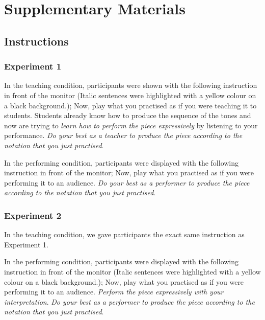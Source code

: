 \documentclass[
  english,
  man,floatsintext]{apa6}
\begin{document}
\endgroup

\clearpage

\hypertarget{supplementary}{%
\section{Supplementary Materials}\label{supplementary}}

\hypertarget{instructions}{%
\subsection{Instructions}\label{instructions}}

\hypertarget{experiment-1-1}{%
\subsubsection{Experiment 1}\label{experiment-1-1}}

In the teaching condition, participants were shown with the following instruction in front of the monitor (Italic sentences were highlighted with a yellow colour on a black background.); Now, play what you practised as if you were teaching it to students. Students already know how to produce the sequence of the tones and now are trying to \emph{learn how to perform the piece expressively} by listening to your performance. \emph{Do your best as a teacher to produce the piece according to the notation that you just practised}.

In the performing condition, participants were displayed with the following instruction in front of the monitor; Now, play what you practised as if you were performing it to an audience. \emph{Do your best as a performer to produce the piece according to the notation that you just practised}.

\hypertarget{experiment-2-1}{%
\subsubsection{Experiment 2}\label{experiment-2-1}}

In the teaching condition, we gave participants the exact same instruction as Experiment 1.

In the performing condition, participants were displayed with the following instruction in front of the monitor (Italic sentences were highlighted with a yellow colour on a black background.); Now, play what you practised as if you were performing it to an audience. \emph{Perform the piece expressively with your interpretation}. \emph{Do your best as a performer to produce the piece according to the notation that you just practised}.
\end{document}
